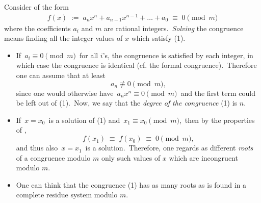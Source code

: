 \documentclass[12pt]{article}
\theoremstyle{definition}
\begin{document}

Consider  of the form
\begin{align}
f(x) \;:=\; a_nx^n+a_{n-1}x^{n-1}+\ldots+a_0 \;\equiv\; 0 \pmod{m}
\end{align}
where the coefficients $a_i$ and $m$ are rational integers.\, \emph{Solving} the congruence means finding all the integer values of $x$ which satisfy (1).

\begin{itemize}

\item If\, $a_i \equiv 0 \pmod{m}$\, for all $i$'s, the congruence is satisfied by each integer, in which case the congruence is identical (cf. the formal congruence).\, Therefore one can assume that at least
$$a_n \not\equiv 0 \pmod{m},$$
since one would otherwise have\, $a_nx^n \equiv 0 \pmod{m}$\, and the first term could be left out of (1).\, Now, we say that the \emph{degree of the congruence} (1) is $n$.

\item If\, $x = x_0$\, is a solution of (1) and\, $x_1 \equiv x_0 \pmod{m}$,\, then by the properties of , 
$$f(x_1) \;\equiv\; f(x_0) \;\equiv\; 0 \pmod{m},$$
and thus also\, $x = x_1$\, is a solution.\, Therefore, one regards as different \emph{roots} of a congruence modulo 
$m$ only such values of $x$ which are incongruent modulo $m$.

\item One can think that the congruence (1) has as many roots as is found in a complete residue system modulo $m$.

\end{itemize}


\end{document}
